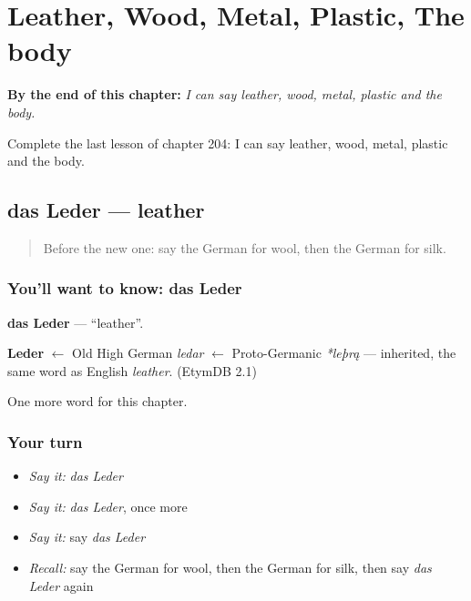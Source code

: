 
\chapter{Leather, Wood, Metal, Plastic, The body}
\label{ch:ge-leather-wood-metal-plastic-the-body}

\begin{chapteropening}
\textbf{By the end of this chapter:} \emph{I can say leather, wood, metal, plastic and the body.}

Complete the last lesson of chapter 204: I can say leather, wood, metal, plastic and the body.
\end{chapteropening}

\section[das Leder]{das Leder — leather}

\label{lesson:GE-C204-leder}



\begin{quote}
Before the new one: say the German for wool, then the German for silk.
\end{quote}

\subsection*{You'll want to know: das Leder}
\textbf{das Leder} — \textquotedblleft{}leather\textquotedblright{}.

\begin{cousinweb}
\textbf{Leder} $\leftarrow$ Old High German \emph{ledar} $\leftarrow$ Proto-Germanic \emph{*leþrą} — inherited, the same word as English \emph{leather}. (EtymDB 2.1)
\end{cousinweb}

\begin{grammarlens}[title={What you've built}]
One more word for this chapter.
\end{grammarlens}

\subsection*{Your turn}
\begin{itemize}
\raggedright
  \item \emph{Say it:} \emph{das Leder}
  \item \emph{Say it:} \emph{das Leder}, once more
  \item \emph{Say it:} say \emph{das Leder}
  \item \emph{Recall:} say the German for wool, then the German for silk, then say \emph{das Leder} again
\end{itemize}

